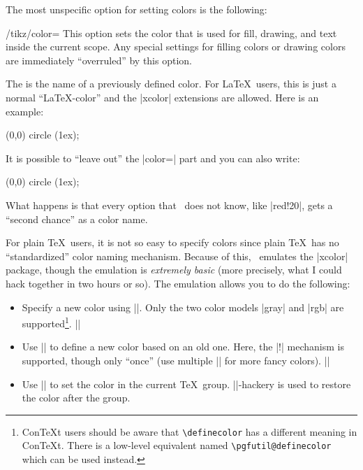 The most unspecific option for setting colors is the following:
%
\begin{key}{/tikz/color=}
    This option sets the color that is used for fill, drawing, and text inside
    the current scope. Any special settings for filling colors or drawing
    colors are immediately ``overruled'' by this option.

    The  is the name of a previously defined color. For
    \LaTeX\ users, this is just a normal ``\LaTeX-color'' and the |xcolor|
    extensions are allowed. Here is an example:
\begin{codeexample}[]
\tikz \fill[color=red!20] (0,0) circle (1ex);
\end{codeexample}

    It is possible to ``leave out'' the |color=| part and you can also write:
\begin{codeexample}[]
\tikz \fill[red!20] (0,0) circle (1ex);
\end{codeexample}
    What happens is that every option that \tikzname\ does not know, like
    |red!20|, gets a ``second chance'' as a color name.

    For plain \TeX\ users, it is not so easy to specify colors since plain
    \TeX\ has no ``standardized'' color naming mechanism. Because of this,
    \pgfname\ emulates the |xcolor| package, though the emulation is
    \emph{extremely basic} (more precisely, what I could hack together in two
    hours or so). The emulation allows you to do the following:
    \begin{itemize}
        \item Specify a new color using |\definecolor|. Only the two color
            models |gray| and |rgb| are supported\footnote{Con\TeX t users
            should be aware that \texttt{\textbackslash definecolor} has a
            different meaning in Con\TeX t. There is a low-level equivalent
            named \texttt{\textbackslash pgfutil@definecolor} which can be
            used instead.}.
            \example ||
        \item Use || to define a new color based on an old one.
            Here, the |!| mechanism is supported, though only ``once'' (use
            multiple || for more fancy colors).
            \example ||
        \item Use |\color| to set the color in the current
            \TeX\ group. |\aftergroup|-hackery is used to restore the color
            after the group.
    \end{itemize}
\end{key}

